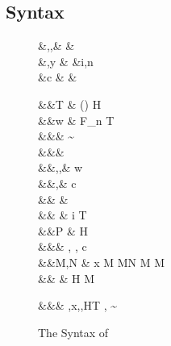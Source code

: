 \documentclass[screen,nonacm,manuscript,review]{acmart} %
\begin{document}
\subsection{Syntax}\label{sec:sfk-syntax}
\begin{figure}[ht]
 \centering
 \begin{syntax}
  &\TyVar,\beta,\Co &  & \\
  &\TmVar,y &\qquad{} &i,n \in {} \\
  &c & &
 \end{syntax}
 \begin{syntax}
  &&T \bnfeq& (\to) \bnfor \star \bnfor H\\
  &&w \bnfeq& \TyVar \bnfor F_n \bnfor T\\
  &&\Prop \bnfeq& \tau\sim\sigma\\
  &&\TyCo \bnfeq& \tau \bnfor \Co\\
  &&\tau,\sigma,\kappa \bnfeq& w \bnfor \tau\App\tau %
 \bnfor \Forall {\TyVar\co\kappa} \tau \bnfor %
 \tau \bnfor \Cast\tau\Co \bnfor \tau\App\Co\\
  &&\MCo,\Co \bnfeq& c \bnfor \Refl\tau \bnfor \Sym\Co \bnfor \Trans\MCo\Co \\ %
 && \bnfor&  \bnfor {} %
 \bnfor {} %
 \bnfor \Co\At\MCo \bnfor {}\\ %
 && \bnfor& \MCo\App\Co \bnfor \Left \Co \bnfor \Right \Co %
 \bnfor \Nth i \Co \bnfor \shl{\Kind \Co} \bnfor T\App\many\phi \\  %
  &&P \bnfeq& H\App \many{\alpha\co\kappa} \shl{\Telescope} \\
  &&\Telescope \bnfeq& \empt \bnfor \Telescope, \TyVar\co\kappa \bnfor \Telescope, c\co\Prop\\
  &&M,N \bnfeq& x \bnfor {} M \bnfor M\App N %
 \bnfor \TLam{\alpha\co\kappa} M \bnfor M\App \tau \\
 && \bnfor&  {\Tm} \bnfor \Tm\App\Co %
 \bnfor H \bnfor \Case M  \bnfor \Cast \Tm \Co
 \end{syntax}
 \begin{syntax}
  &&\TEnv \bnfeq& \empt \bnfor \TEnv,x\co\tau \bnfor \TEnv,\TyVar\co\kappa \bnfor \TEnv,H\co T \bnfor \TEnv, \Co \co \tau\sim\sigma
 \end{syntax}
\caption{The Syntax of \SFK}\label{fig:sfk-syntax}
\end{figure}
\end{document}
